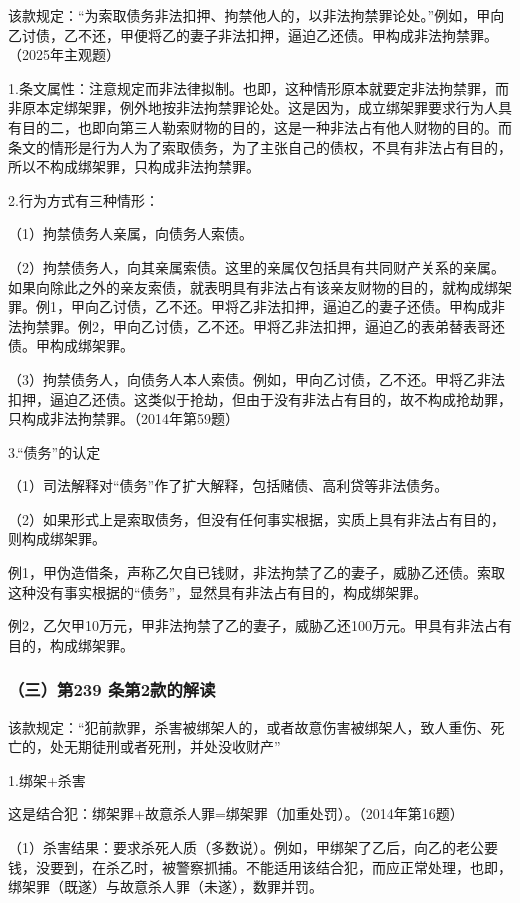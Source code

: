 该款规定：“为索取债务非法扣押、拘禁他人的，以非法拘禁罪论处。”例如，甲向乙讨债，乙不还，甲便将乙的妻子非法扣押，逼迫乙还债。甲构成非法拘禁罪。（2025年主观题）

1.条文属性：注意规定而非法律拟制。也即，这种情形原本就要定非法拘禁罪，而非原本定绑架罪，例外地按非法拘禁罪论处。这是因为，成立绑架罪要求行为人具有目的二，也即向第三人勒索财物的目的，这是一种非法占有他人财物的目的。而条文的情形是行为人为了索取债务，为了主张自己的债权，不具有非法占有目的，所以不构成绑架罪，只构成非法拘禁罪。

2.行为方式有三种情形：

（1）拘禁债务人亲属，向债务人索债。

（2）拘禁债务人，向其亲属索债。这里的亲属仅包括具有共同财产关系的亲属。如果向除此之外的亲友索债，就表明具有非法占有该亲友财物的目的，就构成绑架罪。例1，甲向乙讨债，乙不还。甲将乙非法扣押，逼迫乙的妻子还债。甲构成非法拘禁罪。例2，甲向乙讨债，乙不还。甲将乙非法扣押，逼迫乙的表弟替表哥还债。甲构成绑架罪。

（3）拘禁债务人，向债务人本人索债。例如，甲向乙讨债，乙不还。甲将乙非法扣押，逼迫乙还债。这类似于抢劫，但由于没有非法占有目的，故不构成抢劫罪，只构成非法拘禁罪。（2014年第59题）

3.“债务”的认定

（1）司法解释对“债务”作了扩大解释，包括赌债、高利贷等非法债务。

（2）如果形式上是索取债务，但没有任何事实根据，实质上具有非法占有目的，则构成绑架罪。

例1，甲伪造借条，声称乙欠自已钱财，非法拘禁了乙的妻子，威胁乙还债。索取这种没有事实根据的“债务”，显然具有非法占有目的，构成绑架罪。

例2，乙欠甲10万元，甲非法拘禁了乙的妻子，威胁乙还100万元。甲具有非法占有目的，构成绑架罪。

\subsubsection*{（三）第239 条第2款的解读}

该款规定：“犯前款罪，杀害被绑架人的，或者故意伤害被绑架人，致人重伤、死亡的，处无期徒刑或者死刑，并处没收财产”

1.绑架+杀害

这是结合犯：绑架罪+故意杀人罪=绑架罪（加重处罚）。（2014年第16题）

（1）杀害结果：要求杀死人质（多数说）。例如，甲绑架了乙后，向乙的老公要钱，没要到，在杀乙时，被警察抓捕。不能适用该结合犯，而应正常处理，也即，绑架罪（既遂）与故意杀人罪（未遂），数罪并罚。

